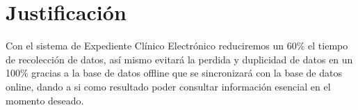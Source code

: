 \label{sec:hipotesis}



\section{Justificación}
Con el sistema de Expediente Clínico Electrónico reduciremos un 60\% el tiempo de recolección de datos, así mismo evitará la perdida y duplicidad de datos en un 100\% gracias a la base de datos offline que se sincronizará con la base de datos online, dando a si como resultado poder consultar información esencial en el momento deseado.
